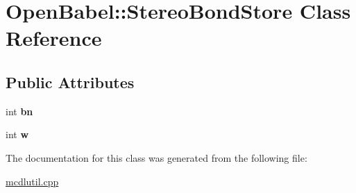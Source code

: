 \hypertarget{class_open_babel_1_1_stereo_bond_store}{\section{Open\-Babel\-:\-:Stereo\-Bond\-Store Class Reference}
\label{class_open_babel_1_1_stereo_bond_store}
}
\subsection*{Public Attributes}
\begin{DoxyCompactItemize}
\item 
\hypertarget{class_open_babel_1_1_stereo_bond_store_a15dccee2218c63bf292d23ccbc674ed1}{int {\bfseries bn}}\label{class_open_babel_1_1_stereo_bond_store_a15dccee2218c63bf292d23ccbc674ed1}

\item 
\hypertarget{class_open_babel_1_1_stereo_bond_store_a812e2c5867419071c404e6bef1f57a8a}{int {\bfseries w}}\label{class_open_babel_1_1_stereo_bond_store_a812e2c5867419071c404e6bef1f57a8a}

\end{DoxyCompactItemize}


The documentation for this class was generated from the following file\-:\begin{DoxyCompactItemize}
\item 
\hyperlink{mcdlutil_8cpp}{mcdlutil.\-cpp}\end{DoxyCompactItemize}
